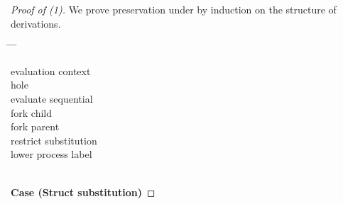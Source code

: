 \documentclass{sigplanconf}
\newenvironment{defn2}{\begin{tabbing}
  \hspace{1.5em} \= \hspace{.295\linewidth - 1.5em} \= \hspace{1.5em} \= \kill
  }{
  \end{tabbing}}
\newcommand{\entry}[2]{\>\>\>#2}
\newcommand{\clause}[2]{\>\>#2}
\newcommand{\mycategory}[2]{\clause{#1::=}{#2}}
\newcommand{\lab}{\mathsf L}
\newcommand{\new}[2]{(\nu #1)\:#2}
\newcommand{\fork}[2]{#1\Rsh\:\!#2}
\newcommand{\eval}[3]{\mathsf{let}~#1=#2~\mathsf{in}~#3}
\begin{document}
\begin{proof}[Proof of (1)] We prove preservation under  by induction on the structure of derivations.
\begin{defn2}
\mycategory{\mathcal E_{\lab;\sigma}}{evaluation context} \\
\entry{\bullet_{\lab;\sigma}}{hole} \\
\entry{\eval x {\mathcal E_{\lab;\sigma}} b}{evaluate sequential} \\
\entry{\fork{\mathcal E_{\lab;\sigma}} b}{fork child} \\
\entry{\fork a \mathcal E_{\lab;\sigma}}{fork parent} \\
\entry{\new {x/\mu @\lab'} \mathcal E_{\lab;\{x/\mu@\lab'\}\cup \sigma}}{restrict substitution} \\
\entry{[\lab']~\mathcal E_{\lab';\sigma}~~~~~(\lab' \sqsubseteq \lab)}{lower process label}
\end{defn2}
\\
{\bf Case (Struct substitution)}


\end{proof}
\end{document}
